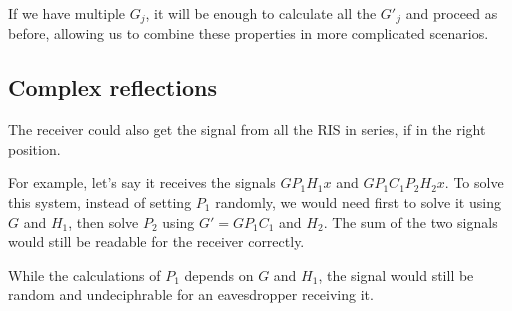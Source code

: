 If we have multiple $G_j$, it will be enough to calculate all the $G'_j$ and proceed as before, allowing us to combine these properties in more complicated scenarios.

\subsection{Complex reflections}

The receiver could also get the signal from all the RIS in series, if in the right position.

For example, let's say it receives the signals $GP_1H_1x$ and $GP_1C_1P_2H_2x$. To solve this system, instead of setting $P_1$ randomly, we would need first to solve it using $G$ and $H_1$, then solve $P_2$ using $G'=GP_1C_1$ and $H_2$. The sum of the two signals would still be readable for the receiver correctly.

While the calculations of $P_1$ depends on $G$ and $H_1$, the signal would still be random and undeciphrable for an eavesdropper receiving it.
